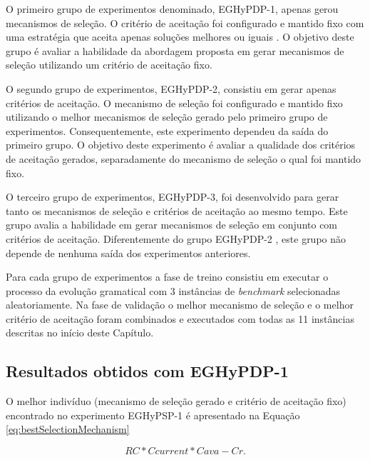 O primeiro grupo de experimentos denominado, EGHyPDP-1, apenas gerou mecanismos de seleção. O critério de aceitação foi configurado e mantido fixo com uma estratégia que aceita apenas soluções melhores ou iguais \cite{burke2013hyper}. O objetivo deste grupo é avaliar a habilidade da abordagem proposta em gerar mecanismos de seleção utilizando um critério de aceitação fixo.

	O segundo grupo de experimentos, EGHyPDP-2, consistiu em gerar apenas critérios de aceitação. O mecanismo de seleção foi configurado e mantido fixo utilizando o melhor mecanismos de seleção gerado pelo primeiro grupo de experimentos. Consequentemente, este experimento dependeu da saída do primeiro grupo. O objetivo deste experimento é avaliar a qualidade dos critérios de aceitação gerados, separadamente do mecanismo de seleção o qual foi mantido fixo.
	
	O terceiro grupo de experimentos,  EGHyPDP-3, foi desenvolvido para gerar tanto os mecanismos de seleção e critérios de aceitação ao mesmo tempo. Este grupo avalia a habilidade em gerar mecanismos de seleção em conjunto com critérios de aceitação. Diferentemente do grupo EGHyPDP-2  , este grupo não depende de nenhuma saída dos experimentos anteriores.

	Para cada grupo de experimentos a fase de treino consistiu em executar o processo da evolução gramatical com 3 instâncias de \textit{benchmark} selecionadas aleatoriamente. Na fase de validação o melhor mecanismo de seleção e o melhor critério de aceitação foram combinados e executados com todas as 11 instâncias descritas no início deste Capítulo. 
	

	
	
	\subsection{Resultados obtidos com EGHyPDP-1}
	\label{subsection:gehypdp1results}
	
	O melhor indivíduo (mecanismo de seleção gerado e critério de aceitação fixo) encontrado no experimento EGHyPSP-1 é apresentado na Equação \ref{eq:bestSelectionMechanism}
	
	\begin{equation}
	\label{eq:bestSelectionMechanism}
	RC * Ccurrent * Cava -Cr.
	\end{equation}
	

